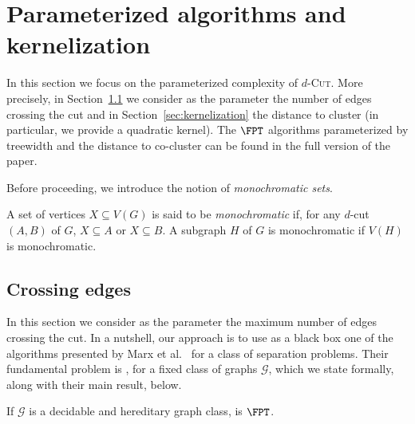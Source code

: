 \section{Parameterized algorithms and kernelization}
\label{sec:param}

In this section we focus on the parameterized complexity of \textsc{$d$-Cut}. More precisely, in Section~\ref{sec:crossing-edges} we consider as the parameter the number of edges crossing the cut and in Section~\ref{sec:kernelization} the distance to cluster (in particular, we provide a quadratic kernel). The $\FPT$ algorithms parameterized by treewidth and the distance to co-cluster can be found in the full version of the paper.

Before proceeding, we introduce the notion of \textit{monochromatic sets}.

\begin{definition}
	A set of vertices $X \subseteq V(G)$ is said to be \emph{monochromatic} if, for any $d$-cut $(A, B)$ of $G$, $X \subseteq A$ or $X \subseteq B$.
	A subgraph $H$ of $G$ is monochromatic if $V(H)$ is monochromatic.
\end{definition}




\subsection{Crossing edges}
\label{sec:crossing-edges}


In this section we consider as the parameter the maximum number of edges crossing the cut. In a nutshell, our approach is to use as a black box one of the algorithms presented by Marx et al.~\cite{marx_treewidth_reduction} for a class of separation problems. Their fundamental problem is , for a fixed class of graphs $\mathcal{G}$, which we state formally, along with their main result, below.



\begin{theorem}
    \label{thm:marx}
    If $\mathcal{G}$ is a decidable and hereditary graph class,  is $\FPT$.
\end{theorem}

